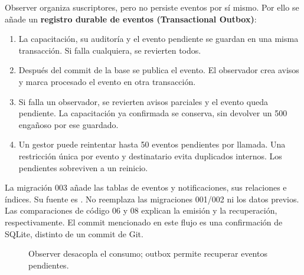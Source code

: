 Observer organiza suscriptores, pero no persiste eventos por sí mismo. Por ello se
añade un \textbf{registro durable de eventos (Transactional Outbox)}:
\begin{enumerate}
\item La capacitación, su auditoría y el evento pendiente se guardan en una misma transacción. Si falla cualquiera, se revierten todos.
\item Después del commit de la base se publica el evento. El observador crea avisos y marca procesado el evento en otra transacción.
\item Si falla un observador, se revierten avisos parciales y el evento queda pendiente. La capacitación ya confirmada se conserva, sin devolver un 500 engañoso por ese guardado.
\item Un gestor puede reintentar hasta 50 eventos pendientes por llamada. Una restricción única por evento y destinatario evita duplicados internos. Los pendientes sobreviven a un reinicio.
\end{enumerate}

La migración 003 añade las tablas de eventos y notificaciones, sus relaciones e
índices. Su fuente es .
No reemplaza las migraciones 001/002 ni los datos previos. Las comparaciones de código 06 y 08
explican la emisión y la recuperación, respectivamente. El commit mencionado en
este flujo es una confirmación de SQLite, distinto de un commit de Git.

\begin{figure}[htbp]\centering
{}
\caption{Observer desacopla el consumo; outbox permite recuperar eventos pendientes.}
\end{figure}

